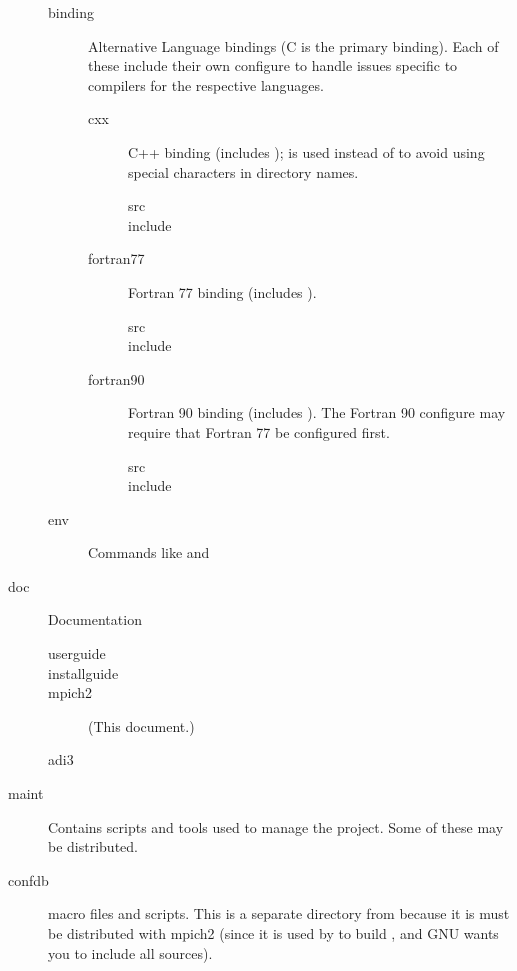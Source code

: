 \documentclass{article}
\begin{document}
\begin{description}
\begin{description}
  \item[binding]Alternative Language bindings (C is the primary
  binding).
	Each of these include their own configure to handle issues
  specific to compilers for the   respective languages.
    \begin{description}
    \item[cxx]C++ binding (includes );  is
    used instead of  to avoid using special characters in
    directory names.
      \begin{description}
      \item[src]
      \item[include]
      \end{description}
    \item[fortran77]Fortran 77 binding (includes ).
      \begin{description}
      \item[src]
      \item[include]
      \end{description}
    \item[fortran90]Fortran 90 binding (includes ).
	The Fortran 90 configure may require that Fortran 77 be
  configured first.
      \begin{description}
      \item[src]
      \item[include]
      \end{description}
    \end{description}
  \item[env]Commands like  and 
  \end{description}
  

\item[doc]Documentation
  \begin{description}
    \item[userguide]
    \item[installguide]
    \item[mpich2] (This document.)
    \item[adi3]
  \end{description}


\item[maint]
  Contains scripts and tools used to manage the project.  Some of these may be
  distributed.

\item[confdb] macro files and scripts.  This is a
separate directory from  because it is must be distributed
with mpich2 (since it is used by  to build
, and GNU wants you to include all sources).


\end{description}
\end{document}
